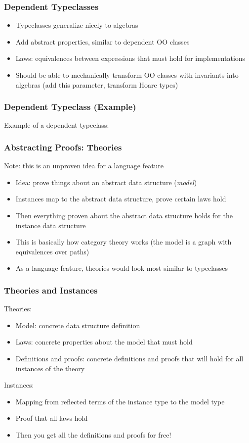 \documentclass{beamer}
\begin{document}
\begin{frame}
  \frametitle{Dependent Typeclasses}
  \begin{itemize}
    \item Typeclasses generalize nicely to algebras
    \item Add abstract properties, similar to dependent OO classes
    \item Laws: equivalences between expressions that must hold for
      implementations
    \item Should be able to mechanically transform OO classes with
      invariants into algebras (add this parameter, transform Hoare
      types)
  \end{itemize}
\end{frame}

\begin{frame}
  \frametitle{Dependent Typeclass (Example)}
  Example of a dependent typeclass:
  
\end{frame}

\begin{frame}
  \frametitle{Abstracting Proofs: Theories}

  Note: this is an unproven idea for a language feature
  \begin{itemize}
    \item Idea: prove things about an abstract data structure
      (\emph{model})
    \item Instances map to the abstract data structure, prove certain laws hold
    \item Then everything proven about the abstract data structure
      holds for the instance data structure
    \item This is basically how category theory works (the model is a
      graph with equivalences over paths)
    \item As a language feature, theories would look most similar to
      typeclasses
  \end{itemize}
\end{frame}

\begin{frame}
  \frametitle{Theories and Instances}
  Theories:
  \begin{itemize}
    \item Model: concrete data structure definition
    \item Laws: concrete properties about the model that must hold
    \item Definitions and proofs: concrete definitions and proofs that
      will hold for all instances of the theory
  \end{itemize}
  Instances:
  \begin{itemize}
    \item Mapping from reflected terms of the instance type to the
      model type
    \item Proof that all laws hold
    \item Then you get all the definitions and proofs for free!
  \end{itemize}
\end{frame}
\end{document}
